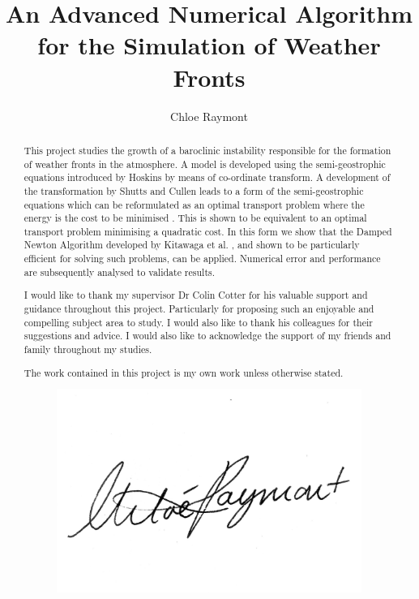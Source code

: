 \documentclass[a4paper, 12pt, twoside]{report}
\title{An Advanced Numerical Algorithm for the Simulation of Weather Fronts}
\author{Chloe Raymont}
\theoremstyle{definition}
\begin{document}

\onehalfspacing
\begin{abstract}
This project studies the growth of a baroclinic instability responsible for the formation of weather fronts in the atmosphere. A model is developed using the semi-geostrophic equations introduced by Hoskins \cite{Hoskins1975} by means of co-ordinate transform. A development of the transformation by Shutts and Cullen \cite{Shutts1987} leads to a form of the semi-geostrophic equations which can be reformulated as an optimal transport problem where the energy is the cost to be minimised \cite{Cullen2006a}. This is shown to be equivalent to an optimal transport problem minimising a quadratic cost. In this form we show that the Damped Newton Algorithm developed by Kitawaga et al. \cite{Kitagawa2016,Merigot2017a},  and shown to be particularly efficient for solving such problems, can be applied. Numerical error and performance are subsequently analysed to validate results.
\end{abstract}

\renewcommand{\abstractname}{Acknowledgements}
\begin{abstract}
I would like to thank my supervisor Dr Colin Cotter for his valuable support and guidance throughout this project. Particularly for proposing such an enjoyable and compelling subject area to study. I would also like to thank his colleagues for their suggestions and advice.
I would also like to acknowledge the support of my friends and family throughout my studies. 
\end{abstract}
\renewcommand{\abstractname}{Declaration}
\begin{abstract}
	The work contained in this project is my own work unless otherwise stated.
	\begin{figure}[h]
		\centering
		\includegraphics[width=0.7\linewidth]{ChloeRaymont_esignature}
	\end{figure}
	
\end{abstract}

\tableofcontents
\listoffigures
\listoftables









\end{document}
